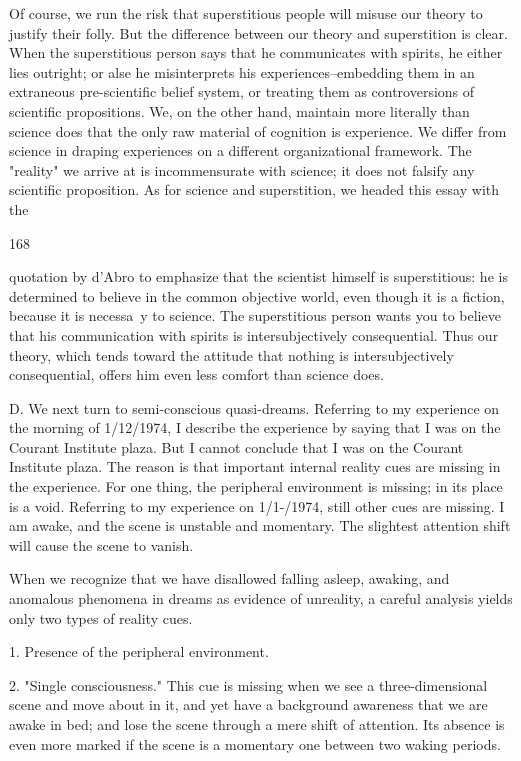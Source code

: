 \documentclass[10pt,twoside]{memoir}
\begin{document}
\begin{enumerate}
{\begin{enumerate}
\begin{sysrules}
\begin{sysrules}
\begin{sysrules}
\begin{sysrules}
{\begin{enumerate}
{{{{{{{Of course, we run the risk that superstitious people will misuse our 
theory to justify their folly. But the difference between our theory and 
superstition is clear. When the superstitious person says that he 
communicates with spirits, he either lies outright; or alse he misinterprets his 
experiences--embedding them in an extraneous pre-scientific belief system, 
or treating them as controversions of scientific propositions. We, on the 
other hand, maintain more literally than science does that the only raw 
material of cognition is experience. We differ from science in draping 
experiences on a different organizational framework. The "reality" we arrive 
at is incommensurate with science; it does not falsify any scientific 
proposition. As for science and superstition, we headed this essay with the 


168 


quotation by d'Abro to emphasize that the scientist himself is superstitious: 
he is determined to believe in the common objective world, even though it is 
a fiction, because it is necessa~y to science. The superstitious person wants 
you to believe that his communication with spirits is intersubjectively 
consequential. Thus our theory, which tends toward the attitude that 
nothing is intersubjectively consequential, offers him even less comfort than 
science does. 

D. We next turn to semi-conscious quasi-dreams. Referring to my 
experience on the morning of 1/12/1974, I describe the experience by saying 
that I was on the Courant Institute plaza. But I cannot conclude that I was 
on the Courant Institute plaza. The reason is that important internal reality 
cues are missing in the experience. For one thing, the peripheral environment 
is missing; in its place is a void. Referring to my experience on 1/1-/1974, 
still other cues are missing. I am awake, and the scene is unstable and 
momentary. The slightest attention shift will cause the scene to vanish. 

When we recognize that we have disallowed falling asleep, awaking, and 
anomalous phenomena in dreams as evidence of unreality, a careful analysis 
yields only two types of reality cues. 

1. Presence of the peripheral environment. 

2. "Single consciousness." This cue is missing when we see a 
three-dimensional scene and move about in it, and yet have a background 
awareness that we are awake in bed; and lose the scene through a mere shift 
of attention. Its absence is even more marked if the scene is a momentary 
one between two waking periods. 

}}}}}}}
\end{enumerate}}
\end{sysrules}
\end{sysrules}
\end{sysrules}
\end{sysrules}
\end{enumerate}}
\end{enumerate}
\end{document}
